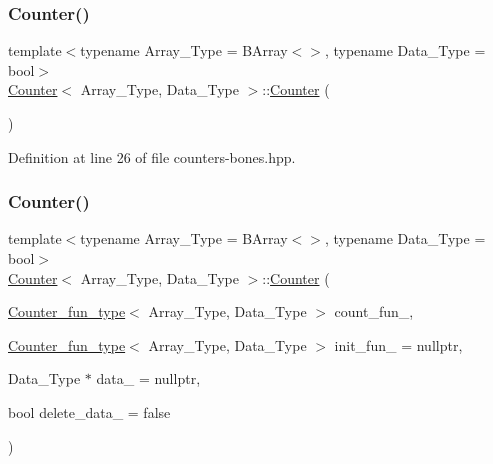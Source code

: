 \subsubsection{\texorpdfstring{Counter()}{Counter()}\hspace{0.1cm}{\footnotesize\ttfamily [1/3]}}
{\footnotesize\ttfamily template$<$typename Array\+\_\+\+Type = B\+Array$<$$>$, typename Data\+\_\+\+Type = bool$>$ \\
\hyperlink{class_counter}{Counter}$<$ Array\+\_\+\+Type, Data\+\_\+\+Type $>$\+::\hyperlink{class_counter}{Counter} (\begin{DoxyParamCaption}{ }\end{DoxyParamCaption})\hspace{0.3cm}{\ttfamily [inline]}}



Definition at line 26 of file counters-\/bones.\+hpp.

\mbox{\label{class_counter_ad2a63c2b9b6c593d292dfd47e2f7a780}} 
\subsubsection{\texorpdfstring{Counter()}{Counter()}\hspace{0.1cm}{\footnotesize\ttfamily [2/3]}}
{\footnotesize\ttfamily template$<$typename Array\+\_\+\+Type = B\+Array$<$$>$, typename Data\+\_\+\+Type = bool$>$ \\
\hyperlink{class_counter}{Counter}$<$ Array\+\_\+\+Type, Data\+\_\+\+Type $>$\+::\hyperlink{class_counter}{Counter} (\begin{DoxyParamCaption}\item[{\hyperlink{typedefs_8hpp_ac0160f52f564dea3ac033b374cffbfe7}{Counter\+\_\+fun\+\_\+type}$<$ Array\+\_\+\+Type, Data\+\_\+\+Type $>$}]{count\+\_\+fun\+\_\+,  }\item[{\hyperlink{typedefs_8hpp_ac0160f52f564dea3ac033b374cffbfe7}{Counter\+\_\+fun\+\_\+type}$<$ Array\+\_\+\+Type, Data\+\_\+\+Type $>$}]{init\+\_\+fun\+\_\+ = {\ttfamily nullptr},  }\item[{Data\+\_\+\+Type $\ast$}]{data\+\_\+ = {\ttfamily nullptr},  }\item[{bool}]{delete\+\_\+data\+\_\+ = {\ttfamily false} }\end{DoxyParamCaption})\hspace{0.3cm}{\ttfamily [inline]}}



